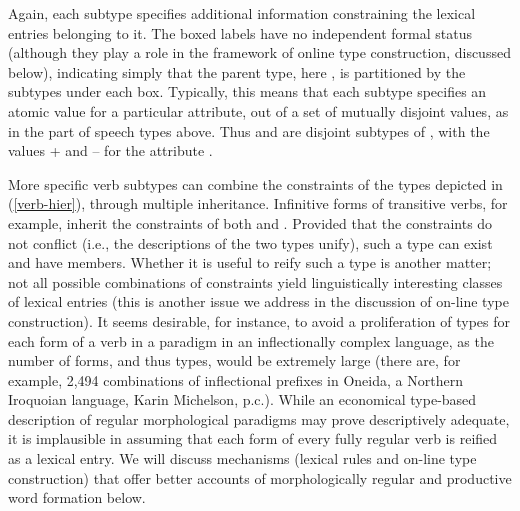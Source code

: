 \documentclass[output=paper]{langsci/langscibook}
\begin{document}
\begin{exe}
  \ex\label{verb-hier}
\end{exe}

Again, each subtype specifies additional information constraining the lexical entries belonging to it.
The boxed labels have no independent formal status (although they play a role in the framework of online type construction, discussed below), indicating simply that the parent type, here , is partitioned by the subtypes under each box.
Typically, this means that each subtype specifies an atomic value for a particular attribute, out of a set of mutually disjoint values, as in the part of speech types above.
Thus  and  are disjoint subtypes of , with the values + and -- for the attribute .

More specific verb subtypes can combine the constraints of the types depicted in (\ref{verb-hier}), through multiple inheritance.
Infinitive forms of transitive verbs, for example, inherit the constraints of both  and .
Provided that the constraints do not conflict (i.e., the descriptions of the two types unify), such a type can exist and have members.
Whether it is useful to reify such a type is another matter; not all possible combinations of constraints yield linguistically interesting classes of lexical entries (this is another issue we address in the discussion of on-line type construction).
It seems desirable, for instance, to avoid a proliferation of types for each form of a verb in a paradigm in an inflectionally complex language, as the number of forms, and thus types, would be extremely large (there are, for example, 2,494 combinations of inflectional prefixes in Oneida, a Northern Iroquoian language, Karin Michelson, p.c.).
While an economical type-based description of regular morphological paradigms may prove descriptively adequate, it is implausible in assuming that each form of every fully regular verb is reified as a lexical entry.
We will discuss mechanisms (lexical rules and on-line type construction) that offer better accounts of morphologically regular and productive word formation below.
\end{document}
